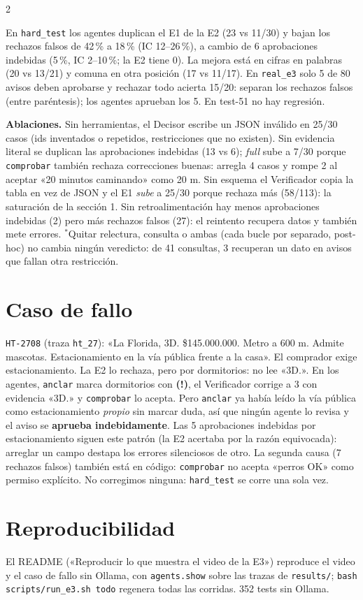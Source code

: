 \documentclass[9pt,a4paper]{extarticle}
\newcommand{\cod}[1]{\texttt{#1}}
\newcommand{\warn}{\textcolor{orange!80!black}{\textbf{(!)}}}
\begin{document}
\begin{multicols}{2}
{En \cod{hard\_test} los agentes duplican el E1 de la E2 (23 vs 11/30) y bajan los rechazos falsos de 42\,\% a 18\,\% (IC 12–26\,\%), a cambio de 6 aprobaciones indebidas (5\,\%, IC 2–10\,\%; la E2 tiene 0). La mejora está en cifras en palabras (20 vs 13/21) y comuna en otra posición (17 vs 11/17). En \cod{real\_e3} solo 5 de 80 avisos deben aprobarse y rechazar todo acierta 15/20: separan los rechazos falsos (entre paréntesis); los agentes aprueban los 5. En test-51 no hay regresión.

\textbf{Ablaciones.} Sin herramientas, el Decisor escribe un JSON inválido en 25/30 casos (ids inventados o repetidos, restricciones que no existen). Sin evidencia literal se duplican las aprobaciones indebidas (13 vs 6); \emph{full} sube a 7/30 porque \cod{comprobar} también rechaza correcciones buenas: arregla 4 casos y rompe 2 al aceptar «20 minutos caminando» como 20 m. Sin esquema el Verificador copia la tabla en vez de JSON y el E1 \emph{sube} a 25/30 porque rechaza más (58/113): la saturación de la sección 1. Sin retroalimentación hay menos aprobaciones indebidas (2) pero más rechazos falsos (27): el reintento recupera datos y también mete errores. $^*$Quitar relectura, consulta o ambas (cada bucle por separado, post-hoc) no cambia ningún veredicto: de 41 consultas, 3 recuperan un dato en avisos que fallan otra restricción.}

\section{Caso de fallo}
\cod{HT-2708} (traza \cod{ht\_27}): «La Florida, 3D. \$145.000.000. Metro a 600 m. Admite mascotas. Estacionamiento en la vía pública frente a la casa». El comprador exige estacionamiento. La E2 lo rechaza, pero por dormitorios: no lee «3D.». En los agentes, \cod{anclar} marca dormitorios con \warn{}, el Verificador corrige a 3 con evidencia «3D.» y \cod{comprobar} lo acepta. Pero \cod{anclar} ya había leído la vía pública como estacionamiento \emph{propio} sin marcar duda, así que ningún agente lo revisa y el aviso se \textbf{aprueba indebidamente}. Las 5 aprobaciones indebidas por estacionamiento siguen este patrón (la E2 acertaba por la razón equivocada): arreglar un campo destapa los errores silenciosos de otro. La segunda causa (7 rechazos falsos) también está en código: \cod{comprobar} no acepta «perros OK» como permiso explícito. No corregimos ninguna: \cod{hard\_test} se corre una sola vez.

\section{Reproducibilidad}
El README («Reproducir lo que muestra el video de la E3») reproduce el video y el caso de fallo sin Ollama, con \cod{agents.show} sobre las trazas de \cod{results/}; \cod{bash scripts/run\_e3.sh todo} regenera todas las corridas. 352 tests sin Ollama.
\end{multicols}
\end{document}
